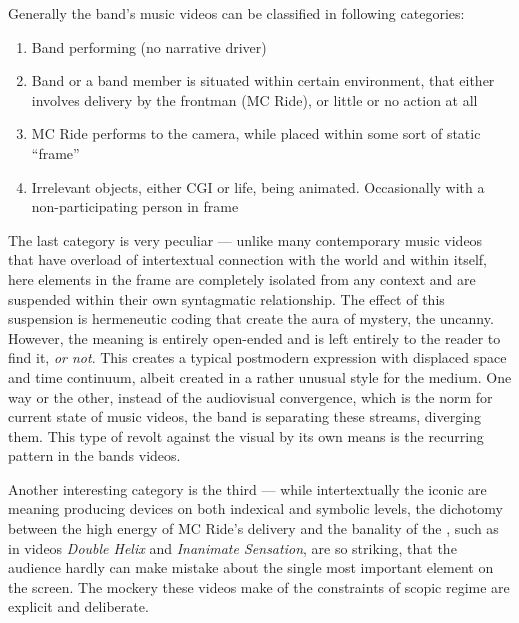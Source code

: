 \documentclass[a4paper, 11pt]{article}
\begin{document}
Generally the band’s music videos can be classified in following categories:

\begin{enumerate}
	\item Band performing (no narrative driver)
	\item Band or a band member is situated within certain environment, that either involves delivery by the frontman (MC Ride), or little or no action at all
	\item MC Ride performs to the camera, while placed within some sort of static “frame”
	\item Irrelevant objects, either CGI or life, being animated. Occasionally with a non-participating person in frame
\end{enumerate}

The last category is very peculiar — unlike many contemporary music videos that have overload of intertextual connection with the world and within itself, here elements in the frame are completely isolated from any context and are suspended within their own syntagmatic relationship. The effect of this suspension is hermeneutic coding that create the aura of mystery, the uncanny. However, the meaning is entirely open-ended and is left entirely to the reader to find it, \textit{or not}. This creates a typical postmodern expression with displaced space and time continuum, albeit created in a rather unusual style for the medium. One way or the other, instead of the audiovisual convergence, which is the norm for current state of music videos, the band is separating these streams, diverging them. This type of revolt against the visual by its own means is the recurring pattern in the bands videos.

 Another interesting category is the third — while intertextually the iconic  are meaning producing devices on both indexical and symbolic levels, the dichotomy between the high energy of MC Ride’s delivery and the banality of the , such as in videos \textit{Double Helix} and \textit{Inanimate Sensation}, are so striking, that the audience hardly can make mistake about the single most important element on the screen. The mockery these videos make of the constraints of scopic regime are explicit and deliberate.
\end{document}

